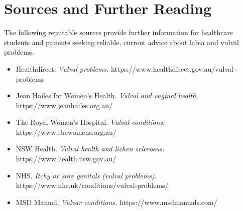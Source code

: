 \section*{Sources and Further Reading}
The following reputable sources provide further information for healthcare students and patients seeking reliable, current advice about labia and vulval problems.
\begin{itemize}
    \item Healthdirect. \textit{Vulval problems.} https://www.healthdirect.gov.au/vulval-problems
    \item Jean Hailes for Women's Health. \textit{Vulval and vaginal health.} https://www.jeanhailes.org.au/
    \item The Royal Women's Hospital. \textit{Vulval conditions.} https://www.thewomens.org.au/
    \item NSW Health. \textit{Vulval health and lichen sclerosus.} https://www.health.nsw.gov.au/
    \item NHS. \textit{Itchy or sore genitals (vulval problems).} https://www.nhs.uk/conditions/vulval-problems/
    \item MSD Manual. \textit{Vulvar conditions.} https://www.msdmanuals.com/
\end{itemize}
